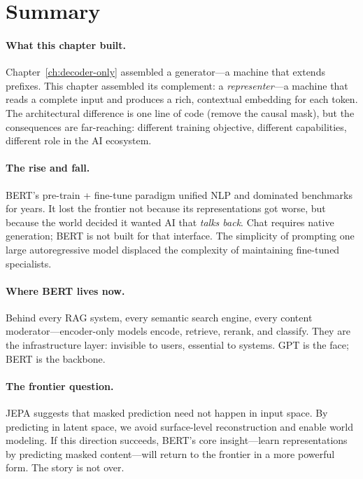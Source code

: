 \section{Summary}

\paragraph{What this chapter built.} Chapter~\ref{ch:decoder-only} assembled a generator---a machine that extends prefixes. This chapter assembled its complement: a \emph{representer}---a machine that reads a complete input and produces a rich, contextual embedding for each token. The architectural difference is one line of code (remove the causal mask), but the consequences are far-reaching: different training objective, different capabilities, different role in the AI ecosystem.

\paragraph{The rise and fall.} BERT's pre-train + fine-tune paradigm unified NLP and dominated benchmarks for years. It lost the frontier not because its representations got worse, but because the world decided it wanted AI that \emph{talks back}. Chat requires native generation; BERT is not built for that interface. The simplicity of prompting one large autoregressive model displaced the complexity of maintaining fine-tuned specialists.

\paragraph{Where BERT lives now.} Behind every RAG system, every semantic search engine, every content moderator---encoder-only models encode, retrieve, rerank, and classify. They are the infrastructure layer: invisible to users, essential to systems. GPT is the face; BERT is the backbone.

\paragraph{The frontier question.} JEPA suggests that masked prediction need not happen in input space. By predicting in latent space, we avoid surface-level reconstruction and enable world modeling. If this direction succeeds, BERT's core insight---learn representations by predicting masked content---will return to the frontier in a more powerful form. The story is not over.

